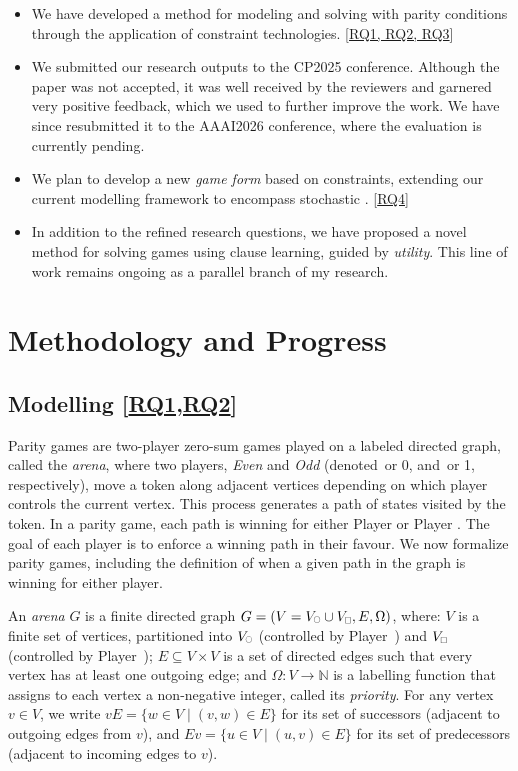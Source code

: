 \documentclass{article}
\begin{document}
\begin{itemize}
  \item We have developed a method for modeling and solving \wregulargames with parity conditions through the application of constraint technologies. [\hyperref[sec:rq]{RQ1, RQ2, RQ3}]
  \item We submitted our research outputs to the CP2025 conference. Although the paper was not accepted, it was well received by the reviewers and garnered very positive feedback, which we used to further improve the work. We have since resubmitted it to the AAAI2026 conference, where the evaluation is currently pending.
  \item We plan to develop a new \textit{game form} based on constraints, extending our current modelling framework to encompass stochastic \wregulargames. [\hyperref[sec:rq]{RQ4}]
  \item In addition to the refined research questions, we have proposed a novel method for solving games using clause learning, guided by \textit{utility}. This line of work remains ongoing as a parallel branch of my research.
\end{itemize}

\section{Methodology and Progress}

\subsection{Modelling [\hyperref[sec:rq]{RQ1,RQ2}]}

 Parity games are two-player zero-sum games played on a labeled directed graph, called the \textit{arena}, where two players, \textit{Even} and \textit{Odd} (denoted~\even or 0, and~\odd or 1, respectively), move a token along adjacent vertices depending on which player controls the current vertex. This process generates a path of states visited by the token. In a parity game, each path is winning for either Player \even or Player \odd. The goal of each player is to enforce a winning path in their favour. We now formalize parity games, including the definition of when a given path in the graph is winning for either player.

\begin{definition}\label{def:arena}
An \textit{arena} \( G \) is a finite directed graph \( G = (V = V_{\subeven} \cup V_{\subodd}, E, \Omega) \), where:
\( V \) is a finite set of vertices, partitioned into \( V_{\subeven} \) (controlled by Player~\even) and \( V_{\subodd} \) (controlled by Player~\odd); 
\( E \subseteq V \times V \) is a set of directed edges such that every vertex has at least one outgoing edge;
and \( \Omega: V \to \mathbb{N} \) is a labelling function that assigns to each vertex a non-negative integer, called its \textit{priority}.
%
For any vertex \( v \in V \), we write \( vE = \{ w \in V \mid (v, w) \in E \} \) for its set of successors (adjacent to outgoing edges from \( v \)), and \( Ev = \{ u \in V \mid (u, v) \in E \} \) for its set of predecessors (adjacent to incoming edges to \( v \)).
\end{definition}
\end{document}

